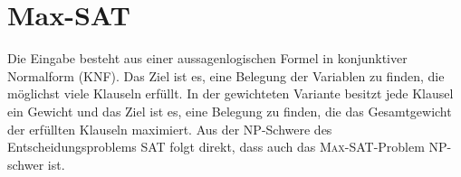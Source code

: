 \documentclass[language=ngerman,algolist]{TemplateLecture}
\begin{document}


\section{Max-SAT}\label{sec:maxSATWtheo}

Die Eingabe besteht aus einer aussagenlogischen Formel in konjunktiver Normalform (KNF). Das Ziel ist es, eine Belegung der Variablen zu finden, die möglichst viele Klauseln erfüllt. In der gewichteten Variante besitzt jede Klausel ein Gewicht und das Ziel ist es, eine Belegung zu finden, die das Gesamtgewicht der erfüllten Klauseln maximiert. Aus der NP-Schwere des Entscheidungsproblems SAT folgt direkt, dass auch das \textsc{Max-SAT}-Problem NP-schwer ist.
\end{document}
